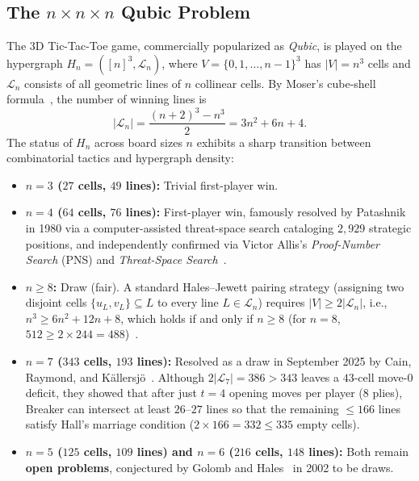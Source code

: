 \documentclass[11pt,a4paper]{article}
\theoremstyle{definition}
\theoremstyle{remark}
\begin{document}
\subsection{The $n \times n \times n$ Qubic Problem}
The $3\text{D}$ Tic-Tac-Toe game, commercially popularized as \emph{Qubic}, is played on the hypergraph $H_n = ([n]^3, \mathcal{L}_n)$, where $V = \{0, 1, \dots, n-1\}^3$ has $|V| = n^3$ cells and $\mathcal{L}_n$ consists of all geometric lines of $n$ collinear cells. By Moser's cube-shell formula~\cite{GolombHales2002}, the number of winning lines is
\begin{equation}
    |\mathcal{L}_n| = \frac{(n+2)^3 - n^3}{2} = 3n^2 + 6n + 4.
\end{equation}
The status of $H_n$ across board sizes $n$ exhibits a sharp transition between combinatorial tactics and hypergraph density:
\begin{itemize}[noitemsep]
    \item \textbf{$n = 3$ ($27$ cells, $49$ lines):} Trivial first-player win.
    \item \textbf{$n = 4$ ($64$ cells, $76$ lines):} First-player win, famously resolved by Patashnik~\cite{Patashnik1980} in 1980 via a computer-assisted threat-space search cataloging $2,929$ strategic positions, and independently confirmed via Victor Allis's \emph{Proof-Number Search} (PNS) and \emph{Threat-Space Search}~\cite{Allis1994}.
    \item \textbf{$n \ge 8$:} Draw (fair). A standard Hales--Jewett pairing strategy (assigning two disjoint cells $\{u_L, v_L\} \subseteq L$ to every line $L \in \mathcal{L}_n$) requires $|V| \ge 2|\mathcal{L}_n|$, i.e., $n^3 \ge 6n^2 + 12n + 8$, which holds if and only if $n \ge 8$ (for $n=8$, $512 \ge 2 \times 244 = 488$)~\cite{HalesJewett1963,GolombHales2002}.
    \item \textbf{$n = 7$ ($343$ cells, $193$ lines):} Resolved as a draw in September 2025 by Cain, Raymond, and K\"allersj\"o~\cite{Cain2025}. Although $2|\mathcal{L}_7| = 386 > 343$ leaves a $43$-cell move-$0$ deficit, they showed that after just $t = 4$ opening moves per player ($8$ plies), Breaker can intersect at least $26$--$27$ lines so that the remaining $\le 166$ lines satisfy Hall's marriage condition ($2 \times 166 = 332 \le 335$ empty cells).
    \item \textbf{$n = 5$ ($125$ cells, $109$ lines) and $n = 6$ ($216$ cells, $148$ lines):} Both remain \textbf{open problems}, conjectured by Golomb and Hales~\cite{GolombHales2002} in 2002 to be draws.
\end{itemize}
\end{document}
